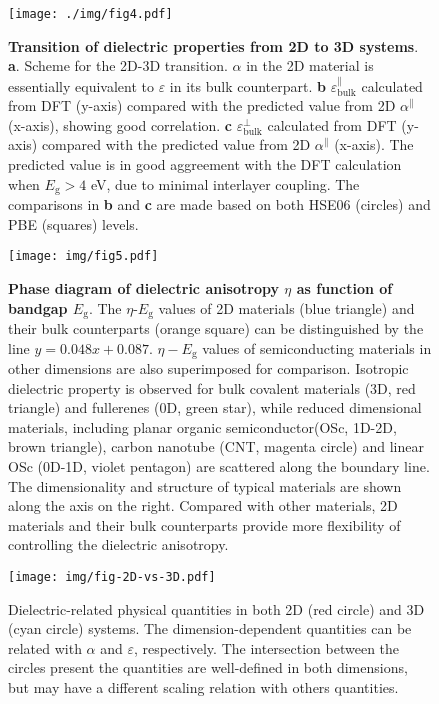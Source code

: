 \documentclass[journal=ancac3,manuscript=article,email=true,hyperref=true,keywords=false]{achemso}
\begin{document}

\begin{figure}[htbp]
\centering
\texttt{[image: ./img/fig4.pdf]}
\caption{\label{fig-4} \textbf{Transition of dielectric properties
    from 2D to 3D systems}. \textbf{a}. Scheme for the 2D-3D
  transition. $\alpha$ in the 2D material is essentially equivalent to
  $\varepsilon$ in its bulk counterpart. \textbf{b}
  $\varepsilon_{\mathrm{bulk}}^{\parallel}$ calculated from DFT
  (y-axis) compared with the predicted value from 2D
  $\alpha^{\parallel}$ (x-axis), showing good correlation. \textbf{c}
  $\varepsilon_{\mathrm{bulk}}^{\perp}$ calculated from DFT (y-axis)
  compared with the predicted value from 2D $\alpha^{\parallel}$
  (x-axis). The predicted value is in good aggreement with the DFT
  calculation when $E_{\mathrm{g}}>4$ eV, due to minimal interlayer
  coupling. The comparisons in \textbf{b} and \textbf{c} are made
  based on both HSE06 (circles) and PBE (squares) levels.}
\end{figure}

\begin{figure}[htbp]
  \centering
  \texttt{[image: img/fig5.pdf]}
  \caption{\textbf{Phase diagram of dielectric anisotropy $\eta$ as
      function of bandgap $E_{\mathrm{g}}$}. The
    $\eta$-$E_{\mathrm{g}}$ values of 2D materials (blue triangle) and
    their bulk counterparts (orange square) can be distinguished by
    the line $y=0.048x+0.087$. $\eta-E_{\mathrm{g}}$ values of
    semiconducting materials in other dimensions are also superimposed
    for comparison. Isotropic dielectric property is observed for bulk
    covalent materials (3D, red triangle) and fullerenes (0D, green
    star), while reduced dimensional materials, including planar
    organic semiconductor(OSc, 1D-2D, brown triangle), carbon nanotube
    (CNT, magenta circle) and linear OSc (0D-1D, violet pentagon) are
    scattered along the boundary line. The dimensionality and
    structure of typical materials are shown along the axis on the
    right. Compared with other materials, 2D materials and their bulk
    counterparts provide more flexibility of controlling the
    dielectric anisotropy.}
  \label{fig:aniso}
\end{figure}

\begin{figure}[htbp]
\centering
\texttt{[image: img/fig-2D-vs-3D.pdf]}
\caption{\label{fig-2D-3D} Dielectric-related physical quantities in
  both 2D (red circle) and 3D (cyan circle) systems. The
  dimension-dependent quantities can be related with $\alpha$ and
  $\varepsilon$, respectively. The intersection between the circles
  present the quantities are well-defined in both dimensions, but may have a
  different scaling relation with others quantities.}
\end{figure}
\end{document}
